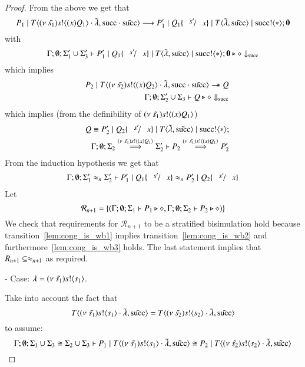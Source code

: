 \begin{proof}
	\noi From the above we get that
	\[
		P_1 \Par T\lrangle{\news{\tilde{s_1}} \bactout{s}{\abs{x}{Q_1}} \cat \tilde{\lambda}, \suc \cat \tilde{\suc}} \red P_1' \Par Q_1 \subst{s'}{x} \Par T\lrangle{\tilde{\lambda}, \tilde{\suc}} \Par \bout{\suc}{\ast} \inact
	\]
	\noi with
	\[
		\Gamma; \emptyset; \Sigma_1' \cup \Sigma_3' \proves P_1' \Par Q_1 \subst{s'}{x} \Par T\lrangle{\tilde{\lambda}, \tilde{\suc}} \Par \bout{\suc}{\ast} \inact \hastype \Proc \barb{\suc}
	\]
	\noi which implies
%
	\begin{eqnarray*}
		& & P_2 \;|\; T\langle (\nu\ \tilde{s_2}) s ! \langle (x)Q_2 \rangle \cdot \tilde{\lambda}, \textrm{succ} \cdot \tilde{\textrm{succ}} \rangle \rightarrow\!\!\!\!\!\rightarrow Q\\
		& & \Gamma; \emptyset; \Sigma_2' \cup \Sigma_3 \vdash Q \triangleright \diamond \Downarrow_{\textrm{succ}}
	\end{eqnarray*}
%
	\noi which implies (from the definibility of $(\nu\ \tilde{s_1}) s ! \langle (x)Q_1 \rangle$)
%
	\begin{eqnarray}
		& & Q \scong P_2' \Par Q_2 \subst{s'}{x} \Par T\lrangle{\tilde{\lambda}, \tilde{\suc}} \Par \bout{\suc}{\ast}\\
		& & \Gamma; \emptyset; \Sigma_2\By{\news{\tilde{s_1}} \bactout{s}{\abs{x}{Q_1}}} \Sigma_2' \proves P_2 \By{\news{\tilde{s_1}} \bactout{s}{\abs{x}{Q_1}}} P_2' \label{lem:cong_is_wb2}
	\end{eqnarray}
%
	\noi From the induction hypothesis we get that
	\begin{eqnarray}
		\Gamma;\emptyset; \Sigma_1' \wb_n \Sigma_2' \proves P_1' \Par Q_1 \subst{s'}{x} \wb_n P_2' \Par Q_2 \subst{s'}{x} \label{lem:cong_is_wb3}
	\end{eqnarray}
%
	\noi Let
	\[
		\mathcal{R}_{n+1} = \{(\Gamma; \emptyset; \Sigma_1 \vdash P_1 \triangleright \diamond, \Gamma; \emptyset; \Sigma_2 \vdash P_2 \triangleright \diamond)\}
	\]
	\noi We check that requirements for $\mathcal{R}_{n+1}$ to be a stratified bisimulation
	hold because transition~\ref{lem:cong_is_wb1} implies transition~\ref{lem:cong_is_wb2}
	and furthermore~\ref{lem:cong_is_wb3} holds.
	The last statement implies that $R_{n+1} \subseteq \approx_{n+1}$ as required.

	\noi - Case: $\lambda = (\nu\ \tilde{s_1}) s ! \langle s_1 \rangle$.

	\noi Take into account the fact that
%
	\[
		T\langle (\nu\ \tilde{s_1}) s ! \langle s_1 \rangle \cdot \tilde{\lambda}, \tilde{\textrm{succ}} \rangle = T\langle (\nu\ \tilde{s_2}) s ! \langle s_2 \rangle \cdot \tilde{\lambda}, \tilde{\textrm{succ}} \rangle
	\]
%
	\noi to assume:
%
	\[
		\Gamma; \emptyset; \Sigma_1 \cup \Sigma_3 \cong \Sigma_2 \cup \Sigma_3  \vdash P_1 \;|\; T\langle (\nu\ \tilde{s_1}) s ! \langle s_1 \rangle \cdot \tilde{\lambda}, \tilde{\textrm{succ}} \rangle \cong P_2 \;|\; T\langle (\nu\ \tilde{s_2}) s ! \langle s_2 \rangle \cdot \tilde{\lambda}, \tilde{\textrm{succ}} \rangle
	\]


\end{proof}
